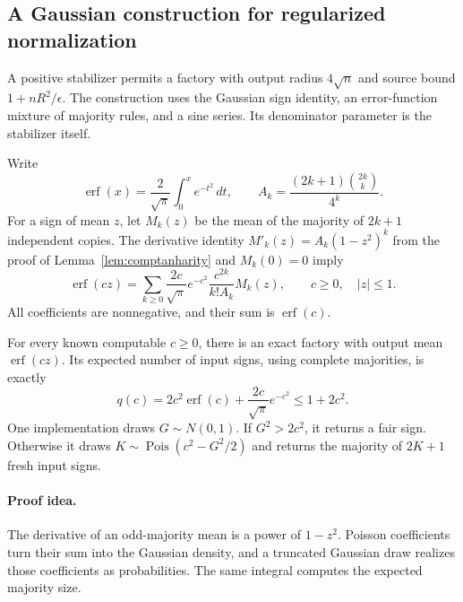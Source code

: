 \subsection{A Gaussian construction for regularized normalization}
\label{sec:gaussianrms}

A positive stabilizer permits a factory with output radius $4\sqrt n$
and source bound $1+nR^2/\epsilon$. The construction uses the Gaussian
sign identity, an error-function mixture of majority rules, and a sine
series. Its denominator parameter is the stabilizer itself.

Write
\[
 \operatorname{erf}(x)=\frac2{\sqrt\pi}\int_0^x e^{-t^2}\,dt,
 \qquad
 A_k=\frac{(2k+1)\binom{2k}{k}}{4^k}.
\]
For a sign of mean $z$, let $M_k(z)$ be the mean of the majority of
$2k+1$ independent copies. The derivative identity
$M'_k(z)=A_k(1-z^2)^k$ from the proof of
Lemma~\ref{lem:comptanharity} and $M_k(0)=0$ imply
\begin{equation}
 \operatorname{erf}(cz)=\sum_{k\ge0}
 \frac{2c}{\sqrt\pi}e^{-c^2}\frac{c^{2k}}{k!A_k}M_k(z),
 \qquad c\ge0,\quad |z|\le1.
 \label{eq:erfmajority}
\end{equation}
All coefficients are nonnegative, and their sum is $\operatorname{erf}(c)$.

\begin{lemma}
\label{lem:erffactory}
For every known computable $c\ge0$, there is an exact factory with
output mean $\operatorname{erf}(cz)$. Its expected number of input
signs, using complete majorities, is exactly
\[
 q(c)=2c^2\operatorname{erf}(c)+\frac{2c}{\sqrt\pi}e^{-c^2}
 \le1+2c^2.
\]
One implementation draws $G\sim N(0,1)$. If $G^2>2c^2$, it returns
a fair sign. Otherwise it draws
$K\sim\operatorname{Pois}(c^2-G^2/2)$ and returns the majority of
$2K+1$ fresh input signs.
\end{lemma}
\paragraph{Proof idea.}
The derivative of an odd-majority mean is a power of $1-z^2$.
Poisson coefficients turn their sum into the Gaussian density, and a
truncated Gaussian draw realizes those coefficients as probabilities.
The same integral computes the expected majority size.

